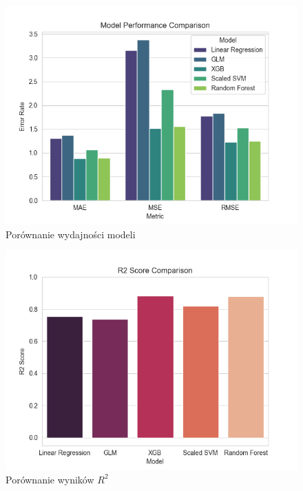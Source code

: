 \documentclass[9pt,a4paper,twoside]{rho}
\begin{document}
        \begin{figure}[H]
            \centering
            \includegraphics[width=1\columnwidth]{plots/Model Performance Comparison.png}
            \caption{Porównanie wydajności modeli}
            \label{fig:perfomance_comp}
        \end{figure}

        \begin{figure}[H]
            \centering
            \includegraphics[width=1\columnwidth]{plots/R2 Score Comparison.png}
            \caption{Porównanie wyników \(R^2\)}
            \label{fig:perfomance_comp_r2}
        \end{figure}
\end{document}

